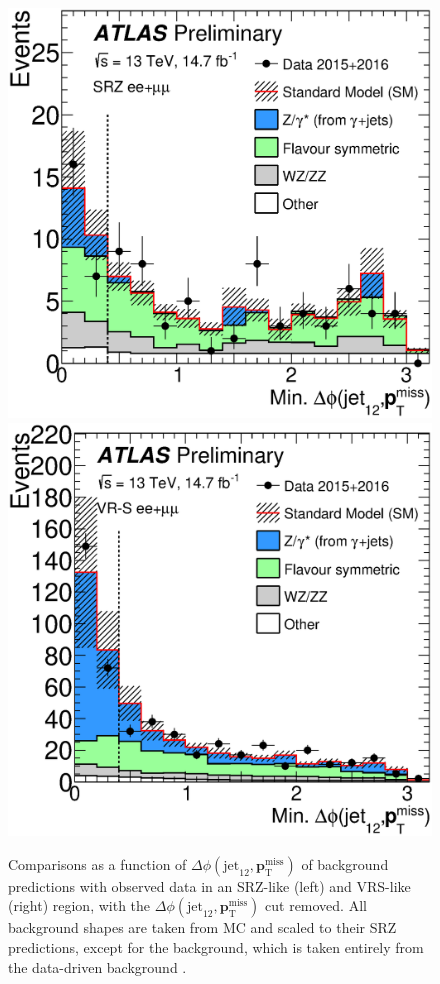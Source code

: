\begin{centering}
\begin{figure}[!hbt]
\myfloatalign
\includegraphics[width=.9\linewidth]{figures/results/dPhi_azmet_ee+mm_onz_SR.eps}
\includegraphics[width=.9\linewidth]{figures/results/dPhi_azmet_ee+mm_onz_VR.eps}
\caption{Comparisons as a function of $\Delta\phi(\text{jet}_{12},{\boldsymbol p}_{\mathrm{T}}^\mathrm{miss})$ of background predictions with observed data in an SRZ-like (left) and VRS-like (right) region, with the $\Delta\phi(\text{jet}_{12},{\boldsymbol p}_{\mathrm{T}}^\mathrm{miss})$ cut removed. All background shapes are taken from \ac{MC} and scaled to their SRZ predictions, except for the \dyjets background, which is taken entirely from the data-driven background \cite{this_paper}.}
\label{fig:results_dphi}
\end{figure}
\end{centering}

